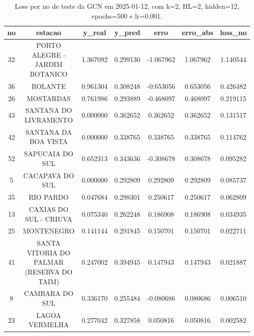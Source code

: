 \begin{table}[h]
\centering
\caption{Loss por no de teste da GCN em 2025-01-12, com k=2, HL=2, hidden=12, epochs=500 e lr=0.001.}
\label{tab:gcn_loss_k2_hl2_h12_e500_d20250112}
\begin{tabular}{ccccccc}
\toprule
no & estacao & y\_real & y\_pred & erro & erro\_abs & loss\_no \\
\midrule
32 & PORTO ALEGRE - JARDIM BOTANICO & 1.367092 & 0.299130 & -1.067962 & 1.067962 & 1.140544 \\
36 & ROLANTE & 0.961304 & 0.308248 & -0.653056 & 0.653056 & 0.426482 \\
26 & MOSTARDAS & 0.761986 & 0.293889 & -0.468097 & 0.468097 & 0.219115 \\
43 & SANTANA DO LIVRAMENTO & 0.000000 & 0.362652 & 0.362652 & 0.362652 & 0.131517 \\
42 & SANTANA DA BOA VISTA & 0.000000 & 0.338765 & 0.338765 & 0.338765 & 0.114762 \\
52 & SAPUCAIA DO SUL & 0.652313 & 0.343636 & -0.308678 & 0.308678 & 0.095282 \\
5 & CACAPAVA DO SUL & 0.000000 & 0.292809 & 0.292809 & 0.292809 & 0.085737 \\
35 & RIO PARDO & 0.047684 & 0.298301 & 0.250617 & 0.250617 & 0.062809 \\
13 & CAXIAS DO SUL - CRIUVA & 0.075340 & 0.262248 & 0.186908 & 0.186908 & 0.034935 \\
25 & MONTENEGRO & 0.141144 & 0.291845 & 0.150701 & 0.150701 & 0.022711 \\
41 & SANTA VITORIA DO PALMAR (RESERVA DO TAIM) & 0.247002 & 0.394945 & 0.147943 & 0.147943 & 0.021887 \\
8 & CAMBARA DO SUL & 0.336170 & 0.255484 & -0.080686 & 0.080686 & 0.006510 \\
23 & LAGOA VERMELHA & 0.277042 & 0.327858 & 0.050816 & 0.050816 & 0.002582 \\
\bottomrule
\end{tabular}
\end{table}
